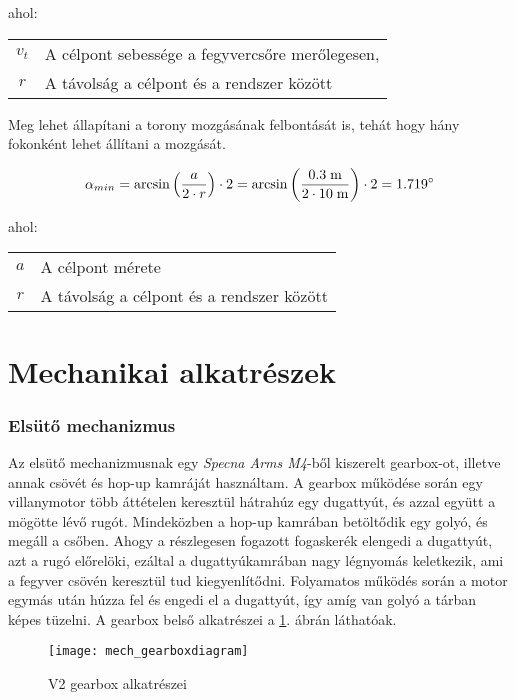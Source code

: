 ahol:

\begin{tabular}{cl}
	$v_t$ & A célpont sebessége a fegyvercsőre merőlegesen, \\
	$r$ & A távolság a célpont és a rendszer között\\
\end{tabular}

Meg lehet állapítani a torony mozgásának felbontását is, tehát hogy hány fokonként lehet állítani a mozgását.

\begin{equation}
	\alpha_{min} = \arcsin\left(\frac{a}{2 \cdot r}\right) \cdot 2 = \arcsin\left(\frac{0.3 \; \mathrm{m}}{2 \cdot 10 \; \mathrm{m}}\right) \cdot 2 = 1.719 {^\circ}
\end{equation}

ahol:

\begin{tabular}{cl}
	$a$ & A célpont mérete  \\
	$r$ & A távolság a célpont és a rendszer között\\
\end{tabular}
\pagebreak
\section{Mechanikai alkatrészek}
\subsubsection*{Elsütő mechanizmus}
Az elsütő mechanizmusnak egy \textsl{Specna Arms M4}-ből kiszerelt gearbox-ot, illetve annak csövét és hop-up kamráját használtam. A gearbox működése során egy villanymotor több áttételen keresztül hátrahúz egy dugattyút, és azzal együtt a mögötte lévő rugót. Mindeközben a hop-up kamrában betöltődik egy golyó, és megáll a csőben. Ahogy a részlegesen fogazott fogaskerék elengedi a dugattyút, azt a rugó előrelöki, ezáltal a dugattyúkamrában nagy légnyomás keletkezik, ami a fegyver csövén keresztül tud kiegyenlítődni. Folyamatos működés során a motor egymás után húzza fel és engedi el a dugattyút, így amíg van golyó a tárban képes tüzelni. A gearbox belső alkatrészei a \ref{fig:mech_gearboxdiagram}. ábrán láthatóak. 

\begin{figure}[h!]
	\centering
	\texttt{[image: mech\_gearboxdiagram]}
	\caption{V2 gearbox alkatrészei \cite{airsoft}}
	\label{fig:mech_gearboxdiagram}
\end{figure}

